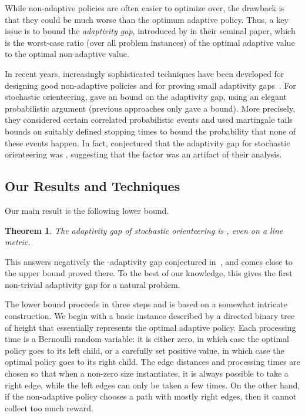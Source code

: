 \documentclass[11pt,letterpaper]{article}
\newtheorem{theorem}{Theorem}[section]
\numberwithin{algorithm}{section}
\begin{document}
While non-adaptive policies are often easier to optimize over, the drawback is that they could be much worse than the optimum adaptive policy. Thus, a key issue is to bound the {\em adaptivity gap}, introduced by \cite{DeanGV08} in their seminal paper,  which is the worst-case ratio (over all problem instances) of the optimal adaptive value to the optimal non-adaptive value. 

In recent years, increasingly sophisticated techniques have been developed for designing good non-adaptive policies and for proving small adaptivity gaps~\cite{DeanGV08,GuhaM09,chenetal,BGLMNR10,GKMR11,GKNR12}.
For stochastic orienteering, \cite{GKNR12} gave an  bound on the adaptivity gap, using an elegant probabilistic argument (previous approaches only gave a  bound).
More precisely, they considered certain  correlated probabilistic events and used martingale tails bounds on suitably defined stopping times to bound the probability that none of these events happen.
In fact, \cite{GKNR12} conjectured that the adaptivity gap for stochastic orienteering was , suggesting that the  factor was an artifact of their analysis.



\subsection{Our Results and Techniques}


Our main result is the following lower bound.
\begin{theorem}\label{thm:ad-gap}
The adaptivity gap of stochastic orienteering is , even on a line metric.
\end{theorem}
This answers negatively the -adaptivity gap conjectured in~\cite{GKNR12}, and comes close to the  upper bound proved there. To the best of our knowledge, this gives the first non-trivial  adaptivity gap for a natural problem.


The lower bound proceeds in three steps and is based on a somewhat intricate construction.
 We begin with a basic instance described by a directed binary tree of height  that essentially represents the optimal adaptive policy. Each processing time is a Bernoulli random variable: it is either zero, in which case the optimal policy goes to its left child, or a carefully set positive value, in which case the optimal policy goes to its right child.
The edge distances and processing times are chosen so that when a non-zero size instantiates, it is always possible to take a right edge, while the left edges can only be taken a few times. On the other hand, if the non-adaptive policy chooses a path with mostly right edges, then it cannot collect too much reward.
\end{document}
